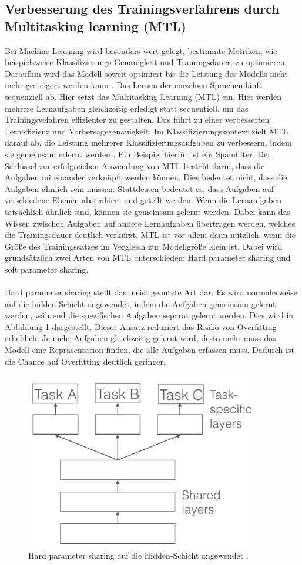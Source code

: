 \subsection{Verbesserung des Trainingsverfahrens durch Multitasking learning (MTL)}
 Bei Machine Learning wird besonders wert gelegt, bestimmte Metriken, wie beispielsweise Klassifizierungs-Genauigkeit und Trainingsdauer, zu optimieren. Daraufhin wird das Modell soweit optimiert bis die Leistung des Modells nicht mehr gesteigert werden kann \cite{Ruder.2017}. Das Lernen  der einzelnen Sprachen läuft sequenziell ab. Hier setzt das Multitasking Learning (MTL) ein.  Hier werden mehrere Lernaufgaben gleichzeitig erledigt statt sequentiell, um das Trainingsvefahren effizienter zu gestalten. Das führt zu einer verbesserten Lerneffizienz und Vorhersagegenauigkeit. Im Klassifizierungskontext zielt MTL darauf ab, die Leistung mehrerer Klassifizierungsaufgaben zu verbessern, indem sie gemeinsam erlernt werden \cite{Lu_multitasklearning}. Ein Beispiel hierfür ist ein Spamfilter. Der Schlüssel zur erfolgreichen Anwendung von MTL besteht darin, dass die Aufgaben miteinander verknüpft werden können. Dies bedeutet nicht, dass die Aufgaben ähnlich sein müssen. Stattdessen bedeutet es, dass Aufgaben auf verschiedene Ebenen abstrahiert und geteilt werden. Wenn die Lernaufgaben tatsächlich ähnlich sind, können sie gemeinsam gelernt werden. Dabei kann das Wissen zwischen Aufgaben auf andere Lernaufgaben übertragen werden, welches die Trainingsdauer deutlich verkürzt. MTL ist vor allem dann nützlich, wenn die Größe des Trainingssatzes im Vergleich zur Modellgröße klein ist. Dabei wird grundsätzlich zwei Arten von MTL unterschieden: Hard parameter sharing und soft parameter sharing. \\ \\ Hard parameter sharing stellt das meist genutzte Art dar\cite{Ruder.2017}. Es wird normalerweise auf die hidden-Schicht angewendet, indem die Aufgaben gemeinsam gelernt werden, während die spezifischen Aufgaben separat gelernt werden. Dies wird in Abbildung \ref{fig:hard} dargestellt. Dieser Ansatz reduziert das Risiko von Overfitting erheblich. Je mehr Aufgaben gleichzeitig gelernt wird, desto mehr muss das Modell eine Repräsentation finden, die alle Aufgaben erfassen muss. Dadurch ist die Chance auf Overfitting deutlich geringer.
  \begin{figure}[h!]
 	\centering
 	\includegraphics[width=0.8\linewidth]{images/hard}
 	\caption{Hard parameter sharing auf die Hidden-Schicht angewendet \cite{Kulbear.2017}.} %
 	\label{fig:hard}
 \end{figure}

